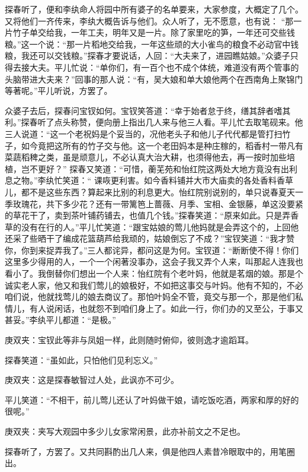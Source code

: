 \begin{parag}
    探春听了，便和李纨命人将园中所有婆子的名单要来，大家参度，大概定了几个。又将他们一齐传来，李纨大概告诉与他们。众人听了，无不愿意，也有说： “那一片竹子单交给我，一年工夫，明年又是一片。除了家里吃的笋，一年还可交些钱粮。”这一个说：“那一片稻地交给我，一年这些顽的大小雀鸟的粮食不必动官中钱粮，我还可以交钱粮。”探春才要说话，人回：“大夫来了，进园瞧姑娘。”众婆子只得去接大夫。平儿忙说：“单你们，有一百个也不成个体统，难道没有两个管事的头脑带进大夫来？”回事的那人说：“有，吴大娘和单大娘他两个在西南角上聚锦门等著呢。”平儿听说，方罢了。
\end{parag}


\begin{parag}
    众婆子去后，探春问宝钗如何。宝钗笑答道：“幸于始者怠于终，缮其辞者嗜其利。”探春听了点头称赞，便向册上指出几人来与他三人看。平儿忙去取笔砚来。他三人说道：“这一个老祝妈是个妥当的，况他老头子和他儿子代代都是管打扫竹子，如今竟把这所有的竹子交与他。这一个老田妈本是种庄稼的，稻香村一带凡有菜蔬稻稗之类，虽是顽意儿，不必认真大治大耕，也须得他去，再一按时加些培植，岂不更好？” 探春又笑道：“可惜，蘅芜苑和怡红院这两处大地方竟没有出利息之物。”李纨忙笑道：“ 课咴更利害。如今香料铺并大市大庙卖的各处香料香草儿，都不是这些东西？算起来比别的利息更大。怡红院别说别的，单只说春夏天一季玫瑰花，共下多少花？还有一带篱笆上蔷薇、月季、宝相、金银藤，单这没要紧的草花干了，卖到茶叶铺药铺去，也值几个钱。”探春笑道：“原来如此。只是弄香草的没有在行的人。”平儿忙笑道：“跟宝姑娘的莺儿他妈就是会弄这个的，上回他还采了些晒干了编成花篮葫芦给我顽的，姑娘倒忘了不成？”宝钗笑道：“我才赞你，你到来捉弄我了。”三人都诧异，都问这是为何。宝钗道：“断断使不得！你们这里多少得用的人，一个一个闲著没事办，这会子我又弄个人来，叫那起人连我也看小了。我倒替你们想出一个人来：怡红院有个老叶妈，他就是茗烟的娘。那是个诚实老人家，他又和我们莺儿的娘极好，不如把这事交与叶妈。他有不知的，不必咱们说，他就找莺儿的娘去商议了。那怕叶妈全不管，竟交与那一个，那是他们私情儿，有人说闲话，也就怨不到咱们身上了。如此一行，你们办的又至公，于事又甚妥。”李纨平儿都道：“是极。”\begin{note}庚双夹：宝钗此等非与凤姐一样，此则随时俯仰，彼则逸才逾蹈耳。\end{note}探春笑道：“虽如此，只怕他们见利忘义。”\begin{note}庚双夹：这是探春敏智过人处，此讽亦不可少。\end{note}平儿笑道：“不相干，前儿莺儿还认了叶妈做干娘，请吃饭吃酒，两家和厚的好的很呢。”\begin{note}庚双夹：夹写大观园中多少儿女家常闲景，此亦补前文之不足也。\end{note}探春听了，方罢了。又共同斟酌出几人来，俱是他四人素昔冷眼取中的，用笔圈出。
\end{parag}


